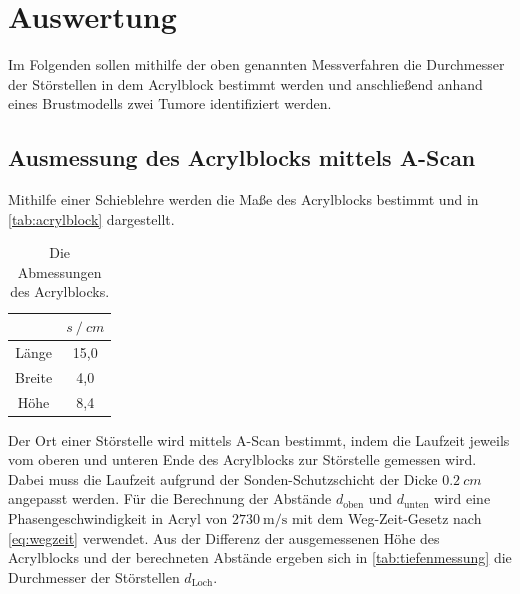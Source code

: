 \section{Auswertung}
\label{sec:Auswertung}

Im Folgenden sollen mithilfe der oben genannten Messverfahren die Durchmesser der Störstellen in dem Acrylblock bestimmt werden
und anschließend anhand eines Brustmodells zwei Tumore identifiziert werden.

\subsection{Ausmessung des Acrylblocks mittels A-Scan} \label{sec:a-scan}

Mithilfe einer Schieblehre werden die Maße des Acrylblocks bestimmt und in \autoref{tab:acrylblock} dargestellt.
\begin{table}
  \centering
  \caption{Die Abmessungen des Acrylblocks.}
  \label{tab:acrylblock}
  \begin{tabular}{c c}
    \toprule
    & $s \mathbin{/} \unit{cm}$ \\
    \midrule
    Länge   & 15,0 \\
    Breite  &  4,0 \\
    Höhe    & 8,4 \\
    \bottomrule
  \end{tabular}
\end{table}
Der Ort einer Störstelle wird mittels A-Scan bestimmt, indem die Laufzeit jeweils vom oberen und unteren Ende des Acrylblocks zur Störstelle gemessen wird.
Dabei muss die Laufzeit aufgrund der Sonden-Schutzschicht der Dicke $\qty{0.2}{cm}$ angepasst werden.
Für die Berechnung der Abstände $d_\text{oben}$ und $d_\text{unten}$ wird eine Phasengeschwindigkeit in Acryl
von $\qty{2730}{\meter\per\second}$ mit dem Weg-Zeit-Gesetz nach \autoref{eq:wegzeit} verwendet.
Aus der Differenz der ausgemessenen Höhe des Acrylblocks und der berechneten Abstände ergeben sich in \autoref{tab:tiefenmessung} die Durchmesser der Störstellen $d_\text{Loch}$.

